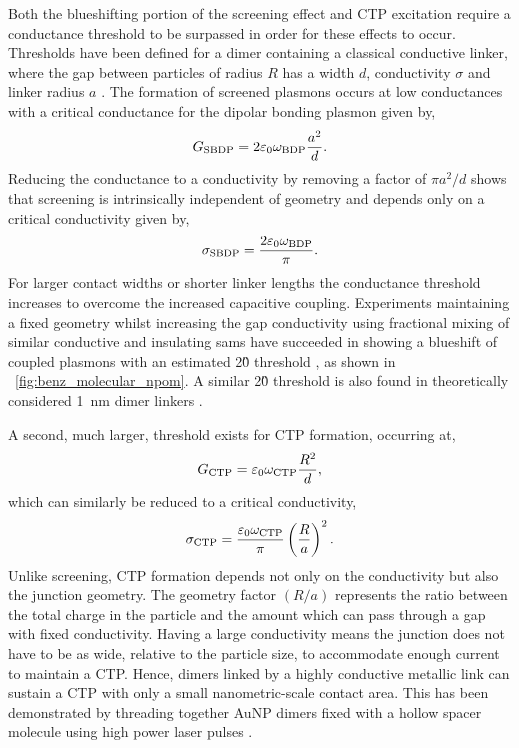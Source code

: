 \documentclass{article}
\begin{document}
Both the blueshifting portion of the screening effect and CTP excitation require a conductance threshold to be surpassed in order for these effects to occur. Thresholds have been defined for a dimer containing a classical conductive linker, where the gap between particles of radius $R$ has a width $d$, conductivity $\sigma$ and linker radius $a$ \cite{perez2010}. The formation of screened plasmons occurs at low conductances with a critical conductance for the dipolar bonding plasmon given by,
\begin{equation}
	G_{\mathrm{SBDP}} = 2\varepsilon_0\omega_{\mathrm{BDP}}\frac{a^2}{d}.
\end{equation}
Reducing the conductance to a conductivity by removing a factor of $\pi a^2/d$ shows that screening is intrinsically independent of geometry and depends only on a critical conductivity given by,
\begin{equation}
	\sigma_{\mathrm{SBDP}} = \frac{2\varepsilon_0\omega_{\mathrm{BDP}}}{\pi}.
\end{equation}
For larger contact widths or shorter linker lengths the conductance threshold increases to overcome the increased capacitive coupling. Experiments maintaining a fixed geometry whilst increasing the gap conductivity using fractional mixing of similar conductive and insulating \glspl{sam} have succeeded in showing a blueshift of coupled plasmons with an estimated 2\G0 threshold \cite{benz2014}, as shown in \figurename~\ref{fig:benz_molecular_npom}. A similar 2\G0 threshold is also found in theoretically considered \SI{1}{nm} dimer linkers \cite{perez2010}.

A second, much larger, threshold exists for CTP formation, occurring at,
\begin{equation}
	G_{\mathrm{CTP}} = \varepsilon_0\omega_{\mathrm{CTP}}\frac{R^2}{d},
\end{equation}
which can similarly be reduced to a critical conductivity,
\begin{equation}
	\sigma_{\mathrm{CTP}} = \frac{\varepsilon_0\omega_{\mathrm{CTP}}}{\pi} \left(\frac{R}{a}\right)^2.
\end{equation}
Unlike screening, CTP formation depends not only on the conductivity but also the junction geometry. The geometry factor $(R/a)$ represents the ratio between the total charge in the particle and the amount which can pass through a gap with fixed conductivity. Having a large conductivity means the junction does not have to be as wide, relative to the particle size, to accommodate enough current to maintain a CTP. Hence, dimers linked by a highly conductive metallic link can sustain a CTP with only a small nanometric-scale contact area. This has been demonstrated by threading together AuNP dimers fixed with a hollow spacer molecule using high power laser pulses \cite{herrmann2014, tserkezis2014}. %
\end{document}
